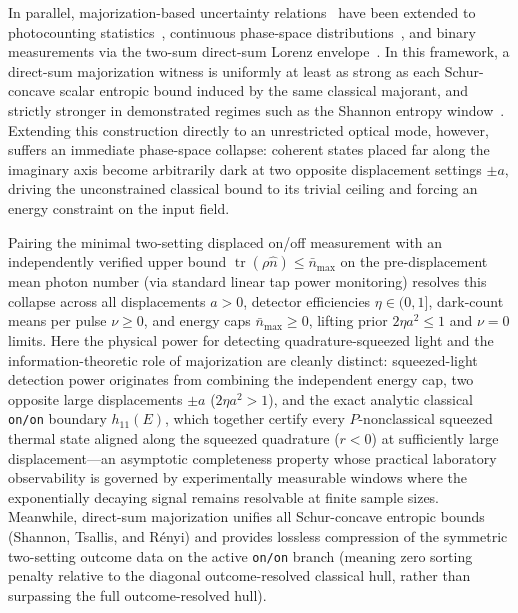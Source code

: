 \documentclass{iopjournal}
\newcommand{\tr}{\operatorname{tr}}
\newcommand{\nbar}{\bar n_{\max}}
\begin{document}
In parallel, majorization-based uncertainty relations~\cite{Friedland2013,Rudnicki2014,Baek2019,YangQiaoOptimization2026,Conlon2026} have been extended to photocounting statistics~\cite{Medranda2015}, continuous phase-space distributions~\cite{VanHerstraeten2023}, and binary measurements via the two-sum direct-sum Lorenz envelope~\cite{ZhuManuscript}. In this framework, a direct-sum majorization witness is uniformly at least as strong as each Schur-concave scalar entropic bound induced by the same classical majorant, and strictly stronger in demonstrated regimes such as the Shannon entropy window~\cite{ZhuManuscript}. Extending this construction directly to an unrestricted optical mode, however, suffers an immediate phase-space collapse: coherent states placed far along the imaginary axis become arbitrarily dark at two opposite displacement settings $\pm a$, driving the unconstrained classical bound to its trivial ceiling and forcing an energy constraint on the input field.

Pairing the minimal two-setting displaced on/off measurement with an independently verified upper bound $\tr(\rho\hat n) \le \nbar$ on the pre-displacement mean photon number (via standard linear tap power monitoring) resolves this collapse across all displacements $a > 0$, detector efficiencies $\eta \in (0,1]$, dark-count means per pulse $\nu \ge 0$, and energy caps $\nbar \ge 0$, lifting prior $2\eta a^2 \le 1$ and $\nu = 0$ limits. Here the physical power for detecting quadrature-squeezed light and the information-theoretic role of majorization are cleanly distinct: squeezed-light detection power originates from combining the independent energy cap, two opposite large displacements $\pm a$ ($2\eta a^2 > 1$), and the exact analytic classical \texttt{on/on} boundary $h_{11}(E)$, which together certify every $P$-nonclassical squeezed thermal state aligned along the squeezed quadrature ($r < 0$) at sufficiently large displacement---an asymptotic completeness property whose practical laboratory observability is governed by experimentally measurable windows where the exponentially decaying signal remains resolvable at finite sample sizes. Meanwhile, direct-sum majorization unifies all Schur-concave entropic bounds (Shannon, Tsallis, and R\'enyi) and provides lossless compression of the symmetric two-setting outcome data on the active \texttt{on/on} branch (meaning zero sorting penalty relative to the diagonal outcome-resolved classical hull, rather than surpassing the full outcome-resolved hull).
\end{document}

